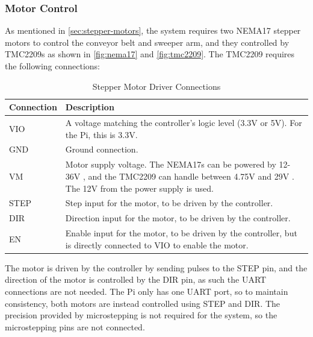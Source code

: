\subsubsection{Motor Control}
As mentioned in \autoref{sec:stepper-motors}, the system requires two NEMA17 stepper motors 
to control the conveyor belt and sweeper arm, and they controlled by TMC2209s as shown in \autoref{fig:nema17} and \autoref{fig:tmc2209}. The TMC2209 requires the following connections:

\begin{table}[H]
    \centering
    {\fontsize{10pt}{12pt}\selectfont
    \begin{tabularx}{\textwidth}{|p{3cm}|X|}
        \hline
        \textbf{Connection} & \textbf{Description} \\
        \hline
        VIO & A voltage matching the controller's logic level (3.3V or 5V). For the Pi, this is 3.3V. \\
        \hline
        GND & Ground connection. \\
        \hline
        VM & Motor supply voltage. The NEMA17s can be powered by 12-36V \cite{nema17}, and the TMC2209 can handle between 4.75V and 29V \cite{tmc2209}. The 12V from the power supply is used. \\
        \hline
        STEP & Step input for the motor, to be driven by the controller. \\
        \hline
        DIR & Direction input for the motor, to be driven by the controller. \\
        \hline
        EN & Enable input for the motor, to be driven by the controller, but is directly connected to VIO to enable the motor. \\
        \hline
    \end{tabularx}
    }
    \caption{Stepper Motor Driver Connections}
    \label{tab:stepper-motor-driver-connections}
\end{table}

The motor is driven by the controller by sending pulses to the STEP pin, and the direction of the motor is controlled by the DIR pin, as such the UART connections are not needed. The Pi only has one UART port, so to maintain consistency, both motors are instead controlled using STEP and DIR. The precision provided by microstepping is not required for the system, so the microstepping pins are not connected.

